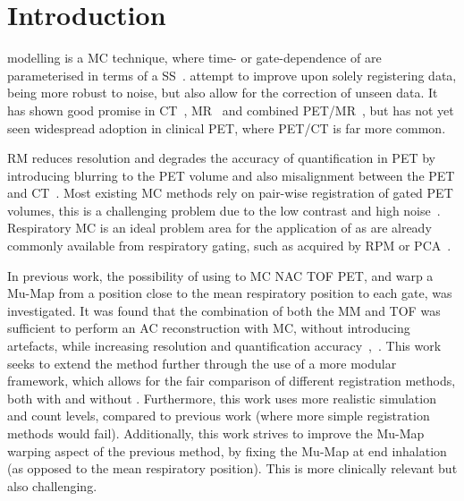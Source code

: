 \section{Introduction} \label{sec:introduction}
     modelling is a \gls{MC} technique, where time- or gate-dependence of  are parameterised in terms of a \gls{SS}~\cite{McClelland2013}.  attempt to improve upon solely registering data, being more robust to noise, but also allow for the correction of unseen data. It has shown good promise in \gls{CT}~\cite{Li2007EnhancedModel}, \gls{MR}~\cite{Manke2002RespiratoryModels}
    and  combined \gls{PET}/\gls{MR}~\cite{Manber2016JointCorrection.}, but has not yet seen widespread adoption in clinical \gls{PET}, where \gls{PET}/\gls{CT} is far more common.
    
    \gls{RM} reduces resolution and degrades the accuracy of quantification in \gls{PET} by introducing blurring to the \gls{PET} volume and also misalignment between the \gls{PET} and \gls{CT}~\cite{Nehmeh2008a}. Most existing \gls{MC} methods rely on pair-wise registration of gated \gls{PET} volumes, this is a challenging problem due to the low contrast and high noise~\cite{Oliveira2014}. Respiratory \gls{MC} is an ideal problem area for the application of  as  are already commonly available from respiratory gating, such as acquired by \gls{RPM} or \gls{PCA}~\cite{Thielemans2011}.
    
    In previous work, the possibility of using  to \gls{MC} \gls{NAC} \gls{TOF} \gls{PET}, and warp a \gls{Mu-Map} from a position close to the mean respiratory position to each gate, was investigated. It was found that the combination of both the \gls{MM} and \gls{TOF} was sufficient to perform an \gls{AC} reconstruction with \gls{MC}, without introducing artefacts, while increasing resolution and quantification accuracy~\cite{Whitehead2019ImpactPET},~\cite{Whitehead2020PET/CTFields}. This work seeks to extend the method further through the use of a more modular framework, which allows for the fair comparison of different registration methods, both with and without . Furthermore, this work uses more realistic simulation and count levels, compared to previous work (where more simple registration methods would fail). Additionally, this work strives to improve the \gls{Mu-Map} warping aspect of the previous method, by fixing the \gls{Mu-Map} at end inhalation (as opposed to the mean respiratory position). This is more clinically relevant but also challenging.
    
